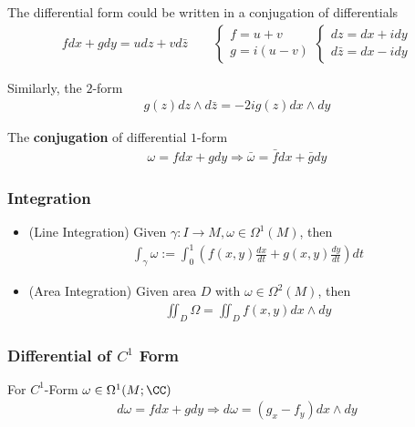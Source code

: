 \documentclass[Total.tex]{subfiles}
\begin{document}
	The differential form could be written in a conjugation of differentials
	\begin{gather*}
		fdx+gdy=udz+vd\bar{z}\qquad\begin{cases}
			f=u+v\\
			g=i(u-v)
		\end{cases}\begin{cases}
			dz=dx+idy\\
			d\bar{z}=dx-idy
		\end{cases}
	\end{gather*}
	
	Similarly, the $2$-form
	\begin{gather*}
		g(z)dz\wedge d\bar{z}=-2ig(z)dx\wedge dy
	\end{gather*}
	
	
	\begin{Def}
		The \textbf{conjugation} of differential $1$-form
		\begin{gather*}
			\omega=fdx+gdy\Rightarrow \bar{\omega}=\bar{f}dx +\bar{g}dy
		\end{gather*}
	\end{Def}
	
	\subsubsection{Integration}
	
	\begin{Def}
		\begin{itemize}
			\item 
			(Line Integration) Given $\gamma:I\rightarrow M, \omega\in \Omega^1(M)$, then
			\begin{gather*}
				\int_\gamma \omega:=\int_0^1(f(x,y)\frac{dx}{dt}+g(x,y)\frac{dy}{dt})dt
			\end{gather*}
			\item (Area Integration) Given area $D$ with $\omega\in \Omega^2(M)$, then
			\begin{gather*}
				\iint_D\Omega=\iint_D f(x,y)dx\wedge dy
			\end{gather*}
		\end{itemize}
	\end{Def}
	
	\subsubsection{Differential of $C^1$ Form}
		For $C^1$-Form $\omega\in \Omega^1(M;\CC)$
		\begin{gather*}
			d\omega=fdx+gdy\Rightarrow d\omega=(g_x-f_y)dx\wedge dy
		\end{gather*}
		
\end{document}
